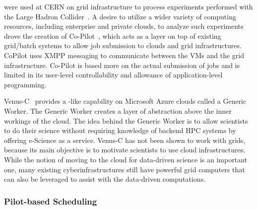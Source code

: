 \documentclass{sig-alternate}
\begin{document}
\pilotjobs were used at CERN on grid infrastructure to process experiments 
performed with the Large Hadron Collider~\cite{copilot-tr}. 
A desire to utilize a wider variety of computing resources, including 
enterprise and private clouds, to analyze such experiments drove the creation 
of Co-Pilot~\cite{copilot-tr}, which acts as a layer on top of existing
grid/batch systems to allow job submission to clouds and grid infrastructures. 
CoPilot uses XMPP messaging to communicate between the VMs and the grid 
infrastructure. Co-Pilot is based more on the actual
submission of jobs and is limited in its user-level controllability and 
allowance of application-level programming.

Venus-C~\cite{venusc-generic-worker} provides a \pilotjob-like
capability on Microsoft Azure clouds called a Generic Worker. The
Generic Worker creates a layer of abstraction above the inner workings
of the cloud.  The idea behind the Generic Worker is to allow
scientists to do their science without requiring knowledge of backend
HPC systems by offering e-Science as a service. Venus-C has not been
shown to work with grids, because its main objective is to motivate
scientists to use cloud infrastructures.  While the notion of moving
to the cloud for data-driven science is an important one, many
existing cyberinfrastructures still have powerful grid computers that
can also be leveraged to assist with the data-driven computations.


\subsubsection{Pilot-based Scheduling}

 
\end{document}

